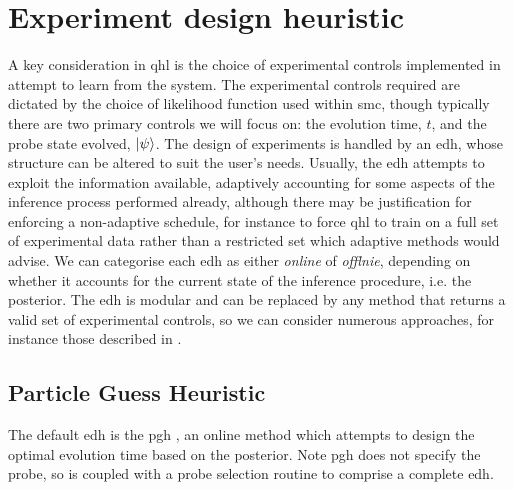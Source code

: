 \section{Experiment design heuristic}
\label{sec:heuristic}
A key consideration in \gls{qhl} is the choice of experimental controls implemented in attempt to learn from the system. 
The experimental controls required are dictated by the choice of \gls{likelihood} function used within \gls{smc}, 
    though typically there are two primary controls we will focus on: 
    the evolution time, $t$, and the \gls{probe} state evolved, $\ket{\psi}$. 
The design of experiments is handled by an \gls{edh}, 
    whose structure can be altered to suit the user's needs. 
Usually, the \gls{edh} attempts to exploit the information available, 
    adaptively accounting for some aspects of the inference process performed already, 
    although there may be justification for enforcing a non-adaptive schedule, 
    for instance to force \gls{qhl} to train on a full set of experimental data 
    rather than a restricted set which adaptive methods would advise.
We can categorise each \gls{edh} as either \emph{online} of \emph{offlnie},
    depending on whether it accounts for the current state of the inference procedure, i.e. the posterior.
The \gls{edh} is modular and can be replaced by any method that returns a valid set of experimental controls, 
    so we can consider numerous approaches, for instance those described in \cite{hincks2018hamiltonian, fiderer2020neural}.
\par 
\subsection{Particle Guess Heuristic}
The default \gls{edh} is the \gls{pgh} \cite{Wiebe:2014qhl}, 
    an online method which attempts to design the optimal evolution time based on the posterior.
Note \gls{pgh} does not specify the \gls{probe}, so is coupled with a \gls{probe} selection routine to comprise 
    a complete \gls{edh}.
\par

